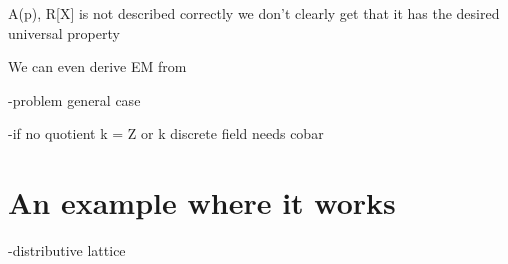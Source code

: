 \documentclass[10pt,a4paper]{article}
\begin{document}
A(p), R[X] is not described correctly
we don't clearly get that it has the desired universal property

We can even derive EM from


-problem general case

-if no quotient k = Z or k discrete field needs cobar


\section{An example where it works}

-distributive lattice




\end{document}
